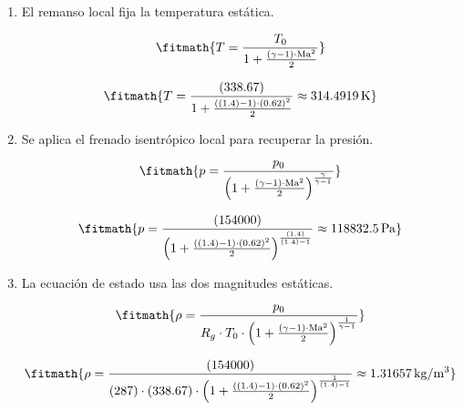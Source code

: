 \begin{enumerate}

\item El remanso local fija la temperatura estática.

\[\fitmath{T=\frac{T_0}{1+\frac{\left(\gamma-1\right)\cdot {\mathrm{Ma}}^{2}}{2}}}\]

\[\fitmath{T=\frac{(338.67)}{1+\frac{\left((1.4)-1\right)\cdot {(0.62)}^{2}}{2}}\approx 314.4919\,\mathrm{K}}\]

\item Se aplica el frenado isentrópico local para recuperar la presión.

\[\fitmath{p=\frac{p_0}{{\left(1+\frac{\left(\gamma-1\right)\cdot {\mathrm{Ma}}^{2}}{2}\right)}^{\frac{\gamma}{\gamma-1}}}}\]

\[\fitmath{p=\frac{(154000)}{{\left(1+\frac{\left((1.4)-1\right)\cdot {(0.62)}^{2}}{2}\right)}^{\frac{(1.4)}{(1.4)-1}}}\approx 118832.5\,\mathrm{Pa}}\]

\item La ecuación de estado usa las dos magnitudes estáticas.

\[\fitmath{\rho=\frac{p_0}{R_g\cdot T_0\cdot {\left(1+\frac{\left(\gamma-1\right)\cdot {\mathrm{Ma}}^{2}}{2}\right)}^{\frac{1}{\gamma-1}}}}\]

\[\fitmath{\rho=\frac{(154000)}{(287)\cdot (338.67)\cdot {\left(1+\frac{\left((1.4)-1\right)\cdot {(0.62)}^{2}}{2}\right)}^{\frac{1}{(1.4)-1}}}\approx 1.31657\,\mathrm{kg/m^{3}}}\]

\end{enumerate}
